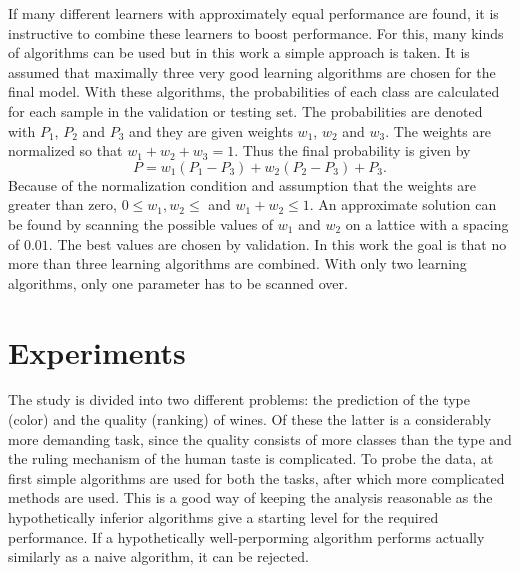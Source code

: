 \documentclass[twoside]{article}
\begin{document}
\begin{multicols}{2}
If many different learners with approximately equal performance are found, it is instructive
to combine these learners to boost performance. For this, many kinds of algorithms can be used
but in this work a simple approach is taken. It is assumed that maximally three very good
learning algorithms are chosen for the final model. With these algorithms, the probabilities
of each class are calculated for each sample in the validation or testing set. The probabilities
are denoted with $P_1$, $P_2$ and $P_3$ and they are given weights $w_1$, $w_2$ and $w_3$.
The weights are normalized so that $w_1 + w_2 + w_3 = 1$. Thus the final probability is given by
\begin{equation}
 P = w_1 ( P_1 - P_3 ) + w_2 ( P_2 - P_3 ) + P_3.
\end{equation}
Because of the normalization condition and assumption that the weights are greater than zero,  $0 \leq w_1,w_2 \leq$ and $w_1 + w_2 \leq 1$. 
An approximate solution can be found by scanning the possible values of $w_1$ and $w_2$ on a lattice with a spacing of $0.01$.
The best values are chosen by validation. In this work the goal is that no more than three learning algorithms are combined.
With only two learning algorithms, only one parameter has to be scanned over.



\section{Experiments}

The study is divided into two different problems: the prediction of the type (color) and the quality (ranking)
of wines. Of these the latter is a considerably more demanding task, since the quality consists of more classes than the type and the
ruling mechanism of the human taste is complicated. To probe the data, at first simple algorithms are used for 
both the tasks, after which more complicated methods are used. This is a good way of keeping the analysis reasonable as
the hypothetically inferior algorithms give a starting level for the required performance. If a hypothetically
well-perporming algorithm performs actually similarly as a naive algorithm, it can be rejected.


\end{multicols}
\end{document}
